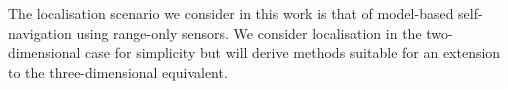 \documentclass[twocolumn]{autart}
\begin{document}






The localisation scenario we consider in this work is that of model-based self-navigation using range-only sensors. We consider localisation in the two-dimensional case for simplicity but will derive methods suitable for an extension to the three-dimensional equivalent.
\end{document}
